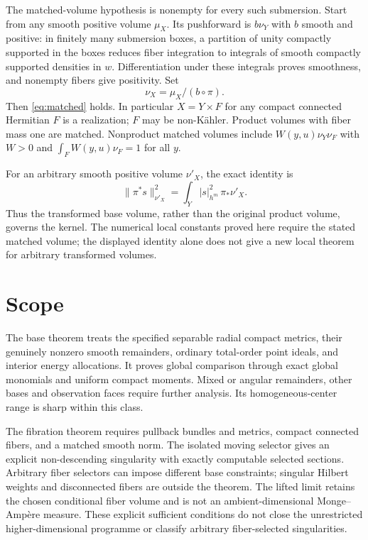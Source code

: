 \documentclass[11pt]{article}
\theoremstyle{remark}\newtheorem{remark}[theorem]{Remark}
\begin{document}
The matched-volume hypothesis is nonempty for every such submersion.
Start from any smooth positive volume $\mu_X$. Its pushforward is
$b\nu_Y$ with $b$ smooth and positive: in finitely many submersion
boxes, a partition of unity compactly supported in the boxes reduces
fiber integration to integrals of smooth compactly supported densities
in $w$. Differentiation under these integrals proves smoothness, and
nonempty fibers give positivity. Set
\[
 \nu_X=\mu_X/(b\circ\pi).
\]
Then \eqref{eq:matched} holds. In particular $X=Y\times F$ for any
compact connected Hermitian $F$ is a realization; $F$ may be non-K\"ahler.
Product volumes with fiber mass one are matched. Nonproduct matched
volumes include $W(y,u)\nu_Y\nu_F$ with $W>0$ and
$\int_FW(y,u)\nu_F=1$ for all $y$.

For an arbitrary smooth positive volume $\nu'_X$, the exact identity is
\[
 \|\pi^*s\|^2_{\nu'_X}=\int_Y|s|_{h^m}^2\,\pi_*\nu'_X.
\]
Thus the transformed base volume, rather than the original product volume,
governs the kernel. The numerical local constants proved here require
the stated matched volume; the displayed identity alone does not give a
new local theorem for arbitrary transformed volumes.

\section{Scope}
The base theorem treats the specified separable radial compact metrics,
their genuinely nonzero smooth remainders, ordinary total-order point
ideals, and interior energy allocations. It proves global comparison
through exact global monomials and uniform compact moments. Mixed or
angular remainders, other bases and observation faces require further
analysis. Its homogeneous-center range is sharp within this class.

The fibration theorem requires pullback bundles and metrics, compact
connected fibers, and a matched smooth norm. The isolated moving selector
gives an explicit non-descending singularity with exactly computable
selected sections. Arbitrary fiber selectors can impose different base
constraints; singular Hilbert weights and disconnected fibers are outside
the theorem. The lifted limit retains the chosen conditional fiber volume
and is not an ambient-dimensional Monge--Amp\`ere measure. These explicit
sufficient conditions do not close the unrestricted higher-dimensional
programme or classify arbitrary fiber-selected singularities.
\end{document}
